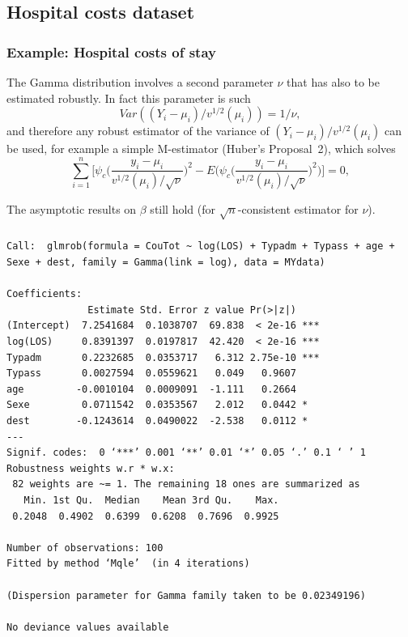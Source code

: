 \documentclass{beamer}
\newcommand{\bs}{\bigskip}
\begin{document}
\subsection{Hospital costs dataset}
\begin{frame}
\frametitle{Example: Hospital costs of stay}

The Gamma distribution involves a second parameter $\nu$ that has also to be
estimated robustly. In fact this parameter is such
$$Var((Y_i - \mu_i)/v^{1/2}(\mu_i)) =1 / \nu,$$
 and therefore any robust estimator of the variance of $(Y_i -
\mu_i)/v^{1/2}(\mu_i)$ can be used, for example a simple M-estimator (Huber's
Proposal~2), which solves
\begin{equation*}
\label{nu.eq}
\sum_{i=1}^n \Big[ \psi_c\Big(\frac{y_i-\mu_i}{v^{1/2}(\mu_i)/\sqrt{\nu}} \Big)^2 -
E\Big(\psi_c\big(\frac{y_i-\mu_i}{v^{1/2}(\mu_i)/\sqrt{\nu}}\big)^2\Big) \Big]= 0,
\end{equation*}

\bs
The asymptotic results on $\beta$ still hold (for $\sqrt{n}$-consistent
estimator for $\nu$).
\end{frame}


\begin{frame}[fragile]
\frametitle{}

{\tiny
\begin{verbatim}
Call:  glmrob(formula = CouTot ~ log(LOS) + Typadm + Typass + age +     
Sexe + dest, family = Gamma(link = log), data = MYdata) 

Coefficients:
              Estimate Std. Error z value Pr(>|z|)    
(Intercept)  7.2541684  0.1038707  69.838  < 2e-16 ***
log(LOS)     0.8391397  0.0197817  42.420  < 2e-16 ***
Typadm       0.2232685  0.0353717   6.312 2.75e-10 ***
Typass       0.0027594  0.0559621   0.049   0.9607    
age         -0.0010104  0.0009091  -1.111   0.2664    
Sexe         0.0711542  0.0353567   2.012   0.0442 *  
dest        -0.1243614  0.0490022  -2.538   0.0112 *  
---
Signif. codes:  0 ‘***’ 0.001 ‘**’ 0.01 ‘*’ 0.05 ‘.’ 0.1 ‘ ’ 1
Robustness weights w.r * w.x: 
 82 weights are ~= 1. The remaining 18 ones are summarized as
   Min. 1st Qu.  Median    Mean 3rd Qu.    Max. 
 0.2048  0.4902  0.6399  0.6208  0.7696  0.9925 

Number of observations: 100 
Fitted by method ‘Mqle’  (in 4 iterations)

(Dispersion parameter for Gamma family taken to be 0.02349196)

No deviance values available 
\end{verbatim}
}
\end{frame}
\end{document}

